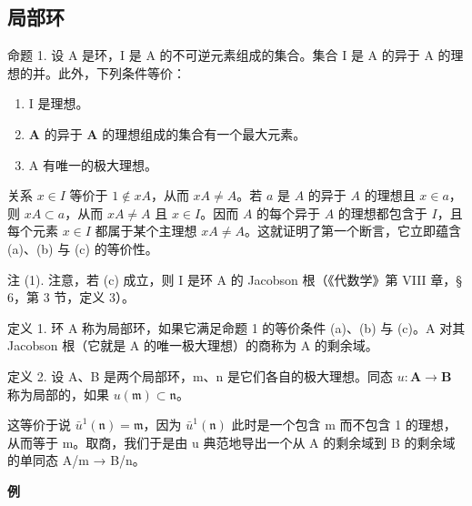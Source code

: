 \subsection{局部环}

命题 1. 设 A 是环，I 是 A 的不可逆元素组成的集合。集合 I 是 A 的异于 A 的理想的并。此外，下列条件等价：

\begin{enumerate}
\def\labelenumi{(\alph{enumi})}
\item
  I 是理想。
\item
  \(\mathbf{A}\) 的异于 \(\mathbf{A}\) 的理想组成的集合有一个最大元素。
\item
  A 有唯一的极大理想。
\end{enumerate}

关系 \(x \in I\) 等价于 \(1 \notin xA\)，从而 \(xA \neq A\)。若 \(a\) 是 \(A\) 的异于 \(A\) 的理想且 \(x \in a\)，则 \(xA \subset a\)，从而 \(xA \neq A\) 且 \(x \in I\)。因而 \(A\) 的每个异于 \(A\) 的理想都包含于 \(I\)，且每个元素 \(x \in I\) 都属于某个主理想 \(xA \neq A\)。这就证明了第一个断言，它立即蕴含 (a)、(b) 与 (c) 的等价性。

注 (1). 注意，若 (c) 成立，则 I 是环 A 的 Jacobson 根（《代数学》第 VIII 章，§ 6，第 3 节，定义 3）。

定义 1. 环 A 称为局部环，如果它满足命题 1 的等价条件 (a)、(b) 与 (c)。A 对其 Jacobson 根（它就是 A 的唯一极大理想）的商称为 A 的剩余域。

定义 2. 设 A、B 是两个局部环，m、n 是它们各自的极大理想。同态 \(u: \mathbf{A} \to \mathbf{B}\) 称为局部的，如果 \(u(\mathfrak{m}) \subset \mathfrak{n}\)。

这等价于说 \(\bar{u}^{1}(\mathfrak{n}) = \mathfrak{m}\)，因为 \(\bar{u}^{1}(\mathfrak{n})\) 此时是一个包含 m 而不包含 1 的理想，从而等于 m。取商，我们于是由 u 典范地导出一个从 A 的剩余域到 B 的剩余域的单同态 A/m → B/n。

\textbf{例}\par

